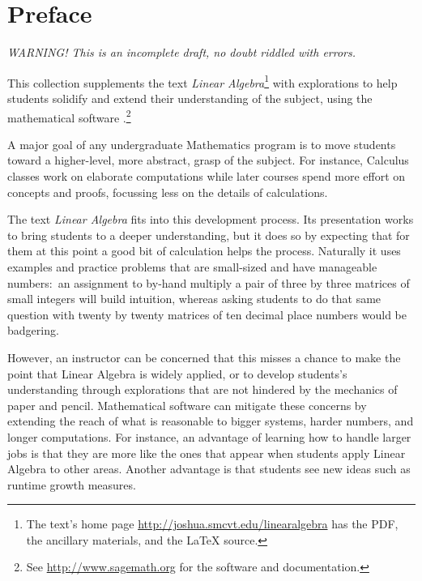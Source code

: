 \chapter*{Preface}\pagestyle{preface}\thispagestyle{preface}
\setlength{\parskip}{.25ex}

\textit{WARNING! This is an incomplete draft,
no doubt riddled with errors.}
\smallskip

This collection supplements the text \nocite{Hefferon12}
\textit{Linear Algebra}\footnote{The text's home page 
\protect\url{http://joshua.smcvt.edu/linearalgebra} 
has the PDF, the ancillary materials, and the \protect\LaTeX{} source.}
with explorations to help students
solidify and extend their understanding of the subject, 
using the mathematical software \Sage{}.\footnote{See 
\url{http://www.sagemath.org} for the software and documentation.}

A major goal of any undergraduate Mathematics program is to move students 
toward a higher-level, more abstract, grasp of the subject.
For instance, Calculus classes work on elaborate computations
while later courses spend more effort on concepts and proofs, focussing
less on the details of calculations.  

The text \textit{Linear Algebra} fits into
this development process.
Its presentation works to bring students to a deeper understanding, 
but it does so by expecting
that for them at this point a good bit of calculation helps the process. 
Naturally it uses examples and practice problems
that are small-sized and have manageable numbers:~an 
assignment to by-hand multiply a pair of three by three matrices
of small integers will build intuition, whereas asking students to do that same 
question with twenty by twenty matrices
of ten decimal place numbers would be badgering. 

However, an instructor can be concerned that this misses a chance 
to make the point that Linear Algebra is widely applied,
or to develop students's understanding through explorations that are not 
hindered by the mechanics of paper and pencil. 
Mathematical software can mitigate these concerns by extending the reach of
what is reasonable 
to bigger systems, harder numbers, and longer computations.
For instance, an advantage of learning how to handle larger jobs is that 
they are more like the ones that appear when students apply Linear 
Algebra to other areas.
Another advantage is that students see new ideas such as 
runtime growth measures.

